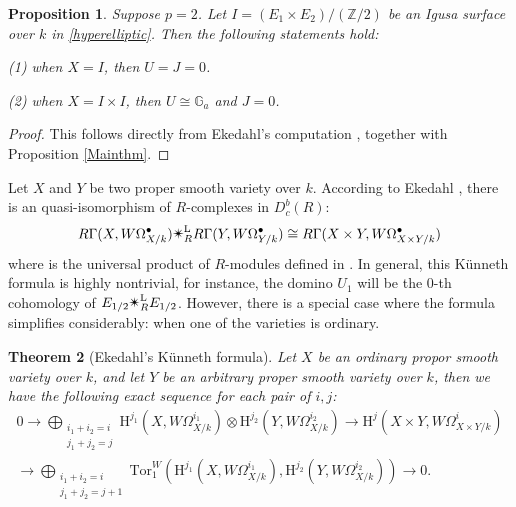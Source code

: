 \documentclass[a4paper,12pt,twoside]{report}
\newtheorem{theorem}{Theorem}[section]
\newtheorem{proposition}[theorem]{Proposition}
\newcommand{\Z}{\mathbb{Z}}
\newcommand{\G}{\mathbb{G}}
\newcommand{\HH}{\mathrm{H}}
\newcommand{\Ld}{\mathrm{L}}
\newcommand{\Tor}{\mathrm{Tor}}
\begin{document}
\begin{proposition}\label{Igusa} Suppose $p=2$. Let $I=(E_1\times E_2)/(\Z/2)$ be an Igusa surface over $k$ in \ref{hyperelliptic}. 
    Then the following statements hold: 

    {\rm    (1)} when $X=I$, then $U=J=0$. 
    
    {\rm    (2)} when $X=I\times I$, then $U\cong \G_a$ and $J=0$. 
\end{proposition}

\begin{proof} This follows directly from Ekedahl’s computation \cite[III.8]{Ek2}, together with Proposition \ref{Mainthm}. \end{proof}

Let $X$ and $Y$ be two proper smooth variety over $k$. According to Ekedahl \cite{Ek2}, 
there is an quasi-isomorphism of $R$-complexes in $D_c^b(R)$: 
\[R\Gamma(X,W\Omega^\bullet_{X/k}) \text{\ding{84}}^{\Ld}_R R\Gamma(Y,W\Omega^\bullet_{Y/k})\cong R\Gamma(X\times Y,W\Omega^\bullet_{X\times Y/k}) \]
where  is the universal product of $R$-modules defined in \cite{Ek2}. 
In general, this K\"unneth formula is highly nontrivial, for instance, 
the domino $U_1$ will be the $0$-th cohomology of $E_{1/2}\text{\ding{84}}^{\Ld}_{R}E_{1/2}$. 
However, there is a special case where the formula simplifies considerably: when one of the varieties is ordinary. 

\begin{theorem}[Ekedahl's K\"unneth formula]\label{X*Y}
    Let $X$ be an ordinary propor smooth variety over $k$, and let $Y$ be an arbitrary proper smooth variety over $k$, 
    then we have the following exact sequence for each pair of $i,j$: 
    \begin{equation*}
        \begin{aligned}
            0\rightarrow \bigoplus_{\substack{
            i_1+i_2=i\\
            j_1+j_2=j}}\HH^{j_1}(X,W\Omega^{i_1}_{X/k})\otimes \HH^{j_2}(Y,W\Omega^{i_2}_{X/k})\rightarrow \HH^j(X\times Y,W\Omega^i_{X\times Y/k})\\
            \rightarrow \bigoplus_{\substack{
            i_1+i_2=i\\
            j_1+j_2=j+1}}\Tor_1^W(\HH^{j_1}(X,W\Omega^{i_1}_{X/k}),\HH^{j_2}(Y,W\Omega^{i_2}_{X/k}))\rightarrow 0.
        \end{aligned}
    \end{equation*}
\end{theorem}
\end{document}
